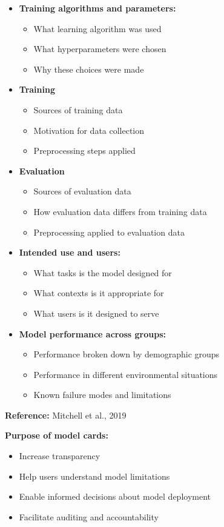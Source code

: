 \documentclass[11pt,a4paper]{article}
\theoremstyle{definition}
\theoremstyle{plain}
\theoremstyle{remark}
\begin{document}
\begin{itemize}
    \item \textbf{Training algorithms and parameters:}
    \begin{itemize}
        \item What learning algorithm was used
        \item What hyperparameters were chosen
        \item Why these choices were made
    \end{itemize}
    
    \item \textbf{Training }
    \begin{itemize}
        \item Sources of training data
        \item Motivation for data collection
        \item Preprocessing steps applied
    \end{itemize}
    
    \item \textbf{Evaluation }
    \begin{itemize}
        \item Sources of evaluation data
        \item How evaluation data differs from training data
        \item Preprocessing applied to evaluation data
    \end{itemize}
    
    \item \textbf{Intended use and users:}
    \begin{itemize}
        \item What tasks is the model designed for
        \item What contexts is it appropriate for
        \item What users is it designed to serve
    \end{itemize}
    
    \item \textbf{Model performance across groups:}
    \begin{itemize}
        \item Performance broken down by demographic groups
        \item Performance in different environmental situations
        \item Known failure modes and limitations
    \end{itemize}
\end{itemize}

\textbf{Reference:} Mitchell et al., 2019

\textbf{Purpose of model cards:}
\begin{itemize}
    \item Increase transparency
    \item Help users understand model limitations
    \item Enable informed decisions about model deployment
    \item Facilitate auditing and accountability
\end{itemize}
\end{document}

